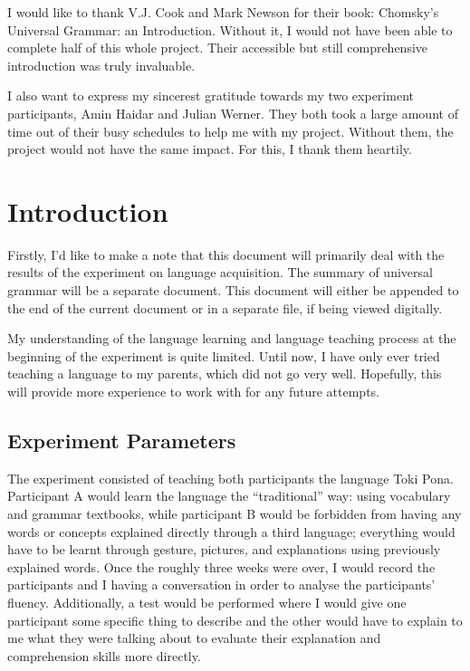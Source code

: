 \documentclass[a4paper,10pt]{article}
\begin{document}
I would like to thank V.J. Cook and Mark Newson for their book: Chomsky's
Universal Grammar: an Introduction. Without it, I would not have been able to complete half of this
whole project. Their accessible but still comprehensive introduction was truly invaluable.

I also want to express my sincerest gratitude towards my two experiment participants, Amin Haidar
and Julian Werner. They both took a large amount of time out of their busy schedules to help me with
my project. Without them, the project would not have the same impact. For this, I thank them heartily.


\section{Introduction}
Firstly, I'd like to make a note that this document will primarily deal with the results of the
experiment on language acquisition. The summary of universal grammar will be a separate document.
This document will either be appended to the end of the current document or in a separate file, if
being viewed digitally.

My understanding of the language learning and language teaching process at the beginning of the
experiment is quite limited. Until now, I have only ever tried teaching a language to my
parents, which did not go very well. Hopefully, this will provide more experience to work with
for any future attempts.

\subsection{Experiment Parameters}
The experiment consisted of teaching both participants the language Toki Pona. Participant A would
learn the language the ``traditional'' way: using vocabulary and grammar textbooks, while participant
B would be forbidden from having any words or concepts explained directly through a third language;
everything would have to be learnt through gesture, pictures, and explanations using previously
explained words. Once the roughly three weeks were over, I would record the participants and I having
a conversation in order to analyse the participants' fluency. Additionally, a test would be performed
where I would give one participant some specific thing to describe and the other would have to explain
to me what they were talking about to evaluate their explanation and comprehension skills more directly.
\end{document}
